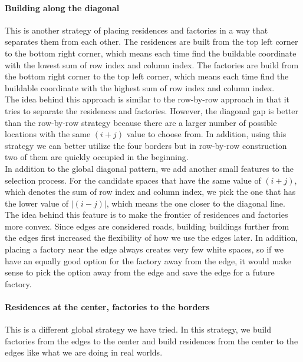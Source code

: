 \paragraph{Building along the diagonal}
This is another strategy of placing residences and factories in a way that separates them from each other. The residences are built from the top left corner to the bottom right corner, which means each time find the buildable coordinate with the lowest sum of row index and column index. The factories are build from the bottom right corner to the top left corner, which means each time find the buildable coordinate with the highest sum of row index and column index.\\

The idea behind this approach is similar to the row-by-row approach in that it tries to separate the residences and factories. However, the diagonal gap is better than the row-by-row strategy because there are a larger number of possible locations with the same $(i+j)$ value to choose from. In addition, using this strategy we can better utilize the four borders but in row-by-row construction two of them are quickly occupied in the beginning.\\

In addition to the global diagonal pattern, we add another small features to the selection process. For the candidate spaces that have the same value of $(i+j)$, which denotes the sum of row index and column index, we pick the one that has the lower value of $|(i-j)|$, which means the one closer to the diagonal line. The idea behind this feature is to make the frontier of residences and factories more convex. Since edges are considered roads, building buildings further from the edges first increased the flexibility of how we use the edges later. In addition, placing a factory near the edge always creates very few white spaces, so if we have an equally good option for the factory away from the edge, it would make sense to pick the option away from the edge and save the edge for a future factory.

\paragraph{Residences at the center, factories to the borders}
This is a different global strategy we have tried. In this strategy, we build factories from the edges to the center and build residences from the center to the edges like what we are doing in real worlds. 

